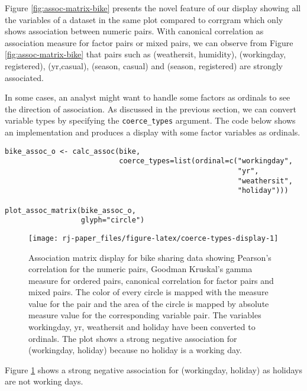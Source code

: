 Figure \ref{fig:assoc-matrix-bike} presents the novel feature of our display showing all the variables of a dataset in the same plot compared to corrgram which only shows association between numeric pairs. With canonical correlation as association measure for factor pairs or mixed pairs, we can observe from Figure \ref{fig:assoc-matrix-bike} that pairs such as (weathersit, humidity), (workingday, registered), (yr,casual), (season, casual) and (season, registered) are strongly associated.

In some cases, an analyst might want to handle some factors as ordinals to see the direction of association. As discussed in the previous section, we can convert variable types by specifying the \texttt{coerce\_types} argument. The code below shows an implementation and produces a display with some factor variables as ordinals.

\begin{verbatim}
bike_assoc_o <- calc_assoc(bike, 
                           coerce_types=list(ordinal=c("workingday", 
                                                       "yr", 
                                                       "weathersit", 
                                                       "holiday")))

plot_assoc_matrix(bike_assoc_o,
                  glyph="circle")
\end{verbatim}

\begin{figure}

{\centering \texttt{[image: rj-paper\_files/figure-latex/coerce-types-display-1]} 

}

\caption{Association matrix display for bike sharing data showing Pearson's correlation for the numeric pairs, Goodman Kruskal's gamma measure for ordered pairs, canonical correlation for factor pairs and mixed pairs. The color of every circle is mapped with the measure value for the pair and the area of the circle is mapped by absolute measure value for the corresponding variable pair. The variables workingday, yr, weathersit and holiday have been converted to ordinals. The plot shows a strong negative association for (workingday, holiday) because no holiday is a working day.}\label{fig:coerce-types-display}
\end{figure}

Figure \ref{fig:coerce-types-display} shows a strong negative association for (workingday, holiday) as holidays are not working days.

